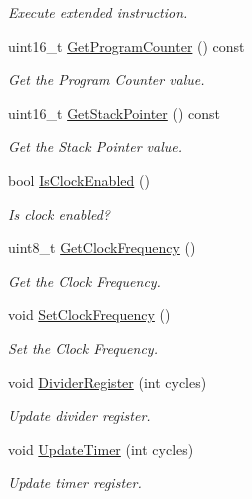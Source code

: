 \begin{DoxyCompactItemize}
\begin{DoxyCompactList}\small\item\em Execute extended instruction. \end{DoxyCompactList}\item 
uint16\+\_\+t \mbox{\hyperlink{classCPU_a7882dfef1d06166e828f917368493625}{Get\+Program\+Counter}} () const
\begin{DoxyCompactList}\small\item\em Get the Program Counter value. \end{DoxyCompactList}\item 
uint16\+\_\+t \mbox{\hyperlink{classCPU_a570d34ada158ddb45f8ba8dc0e5f218a}{Get\+Stack\+Pointer}} () const
\begin{DoxyCompactList}\small\item\em Get the Stack Pointer value. \end{DoxyCompactList}\item 
bool \mbox{\hyperlink{classCPU_a66108f133258f1d4348e79f19287d4ed}{Is\+Clock\+Enabled}} ()
\begin{DoxyCompactList}\small\item\em Is clock enabled? \end{DoxyCompactList}\item 
uint8\+\_\+t \mbox{\hyperlink{classCPU_a852335312c1040d2fcde2a690443d425}{Get\+Clock\+Frequency}} ()
\begin{DoxyCompactList}\small\item\em Get the Clock Frequency. \end{DoxyCompactList}\item 
\mbox{\label{classCPU_ab9ecfdbbe82fef8bff9443ff94b7ca70}} 
void \mbox{\hyperlink{classCPU_ab9ecfdbbe82fef8bff9443ff94b7ca70}{Set\+Clock\+Frequency}} ()
\begin{DoxyCompactList}\small\item\em Set the Clock Frequency. \end{DoxyCompactList}\item 
void \mbox{\hyperlink{classCPU_ae6c57423f6edcd249286c73e8e620bb9}{Divider\+Register}} (int cycles)
\begin{DoxyCompactList}\small\item\em Update divider register. \end{DoxyCompactList}\item 
void \mbox{\hyperlink{classCPU_ad8eb59dff5e4fe4c1b2881cc67574ddf}{Update\+Timer}} (int cycles)
\begin{DoxyCompactList}\small\item\em Update timer register. \end{DoxyCompactList}\item 

\end{DoxyCompactItemize}
